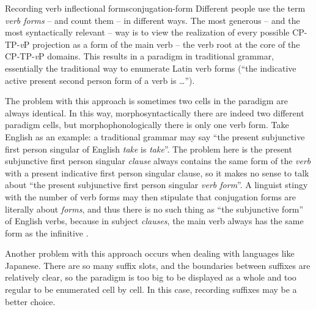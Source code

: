 \documentclass[a4paper, oneside]{report}
\newcommand*{\citepage}[1]{p.~{#1}}
\newcommand*{\term}[1]{\emph{#1}}
\newcommand{\form}[1]{\emph{#1}}
\newcommand{\vP}{\textit{v}P}
\begin{document}
\begin{infobox}{Recording verb inflectional forms}{conjugation-form}
    Different people use the term \term{verb forms} -- and count them -- in different ways.
    The most generous -- and the most syntactically relevant -- way 
    is to view the realization of every possible CP-TP-\vP{} projection 
    as a form of the main verb -- the verb root at the core of the CP-TP-\vP{} domains.
    This results in a paradigm in traditional grammar, 
    essentially the traditional way to enumerate Latin verb forms 
    (``the indicative active present second person form of a verb is \dots'').

    The problem with this approach is sometimes two cells in the paradigm are always identical.
    In this way, morphosyntactically there are indeed two different paradigm cells,
    but morphophonologically there is only one verb form.
    Take English as an example: 
    a traditional grammar may say 
    ``the present subjunctive first person singular of English \form{take} is \form{take}''. 
    The problem here is the present subjunctive first person singular \emph{clause}
    always contains the same form of the \emph{verb}
    with a present indicative first person singular clause,
    so it makes no sense to talk about ``the present subjunctive first person singular \emph{verb form}''.
    A linguist stingy with the number of verb forms 
    may then stipulate that conjugation forms are literally about \emph{forms},
    and thus there is no such thing as ``the subjunctive form'' of English verbs,
    because in subject \emph{clauses}, 
    the main verb always has the same form as the infinitive
    \citep[\citepage{76}]{cgel}.

    Another problem with this approach occurs 
    when dealing with languages like Japanese.
    There are so many suffix slots,
    and the boundaries between suffixes are relatively clear,
    so the paradigm is too big to be displayed as a whole
    and too regular to be enumerated cell by cell.
    In this case, recording suffixes may be a better choice.


\end{infobox}
\end{document}
